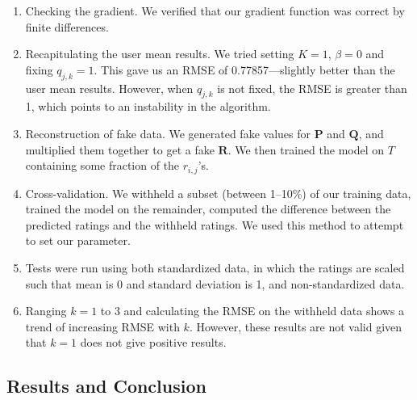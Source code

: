 \documentclass[11pt]{amsart}
\newcommand{\mat}[1]{\mathbf{#1}}
\begin{document}
\begin{enumerate}
\item Checking the gradient. We verified that our gradient function was correct by finite differences.
\item Recapitulating the user mean results. We tried setting $K=1$, $\beta=0$ and fixing $q_{j,k} = 1$. This gave us an RMSE of 0.77857---slightly better than the user mean results. However, when $q_{j,k}$ is not fixed, the RMSE is greater than 1, which points to an instability in the algorithm.
\item Reconstruction of fake data. We generated fake values for $\mat{P}$ and $\mat{Q}$, and multiplied them together to get a fake $\mat{R}$. We then trained the model on $T$ containing some fraction of the $r_{i,j}$'s.  
\item Cross-validation. We withheld a subset (between 1--10\%) of our training data, trained the model on the remainder, computed the difference between the predicted ratings and the withheld ratings. We used this method to attempt to set our parameter.
\item Tests were run using both standardized data, in which the ratings are scaled such that mean is 0 and standard deviation is 1, and non-standardized data.
\item Ranging $k=1$ to 3 and calculating the RMSE on the withheld data shows a trend of increasing RMSE with $k$. However, these results are not valid given that $k=1$ does not give positive results.
 
\end{enumerate}

\subsection{Results and Conclusion}




\end{document}

